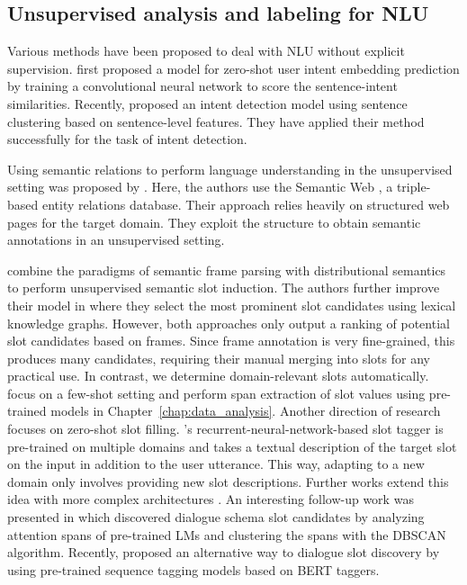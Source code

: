 \subsection{Unsupervised analysis and labeling for NLU}
Various methods have been proposed to deal with NLU without explicit supervision.
\citet{chen2016zero} first proposed a model for zero-shot user intent embedding prediction by training a convolutional neural network to score the sentence-intent similarities.
Recently, \citet{shi2018auto} proposed an intent detection model using sentence clustering based on sentence-level features.
They have applied their method successfully for the task of intent detection.

Using semantic relations to perform language understanding in the unsupervised setting was proposed by \citet{heck2012exploiting}.
Here, the authors use the Semantic Web \cite{berners2001semantic}, a triple-based entity relations database.
Their approach relies heavily on structured web pages for the target domain.
They exploit the structure to obtain semantic annotations in an unsupervised setting.

\label{sec:relwork-chen}
\citet{chen2014leveraging} combine the paradigms of semantic frame parsing with distributional semantics to perform unsupervised semantic slot induction.
The authors further improve their model in \citet{chen2015jointly} where they select the most prominent slot candidates using lexical knowledge graphs.
However, both approaches only output a ranking of potential slot candidates based on frames.
Since frame annotation is very fine-grained, this produces many candidates, requiring their manual merging  %
into slots for any practical use.
In contrast, we determine domain-relevant slots automatically.
\citet{coope_span-convert_2020} focus on a few-shot setting and perform span extraction of slot values using pre-trained models in Chapter~\ref{chap:data_analysis}.
Another direction of research focuses on zero-shot slot filling.  \citet{bapna2017towards}'s recurrent-neural-network-based slot tagger is pre-trained on multiple domains and takes a textual description of the target slot on the input in addition to the user utterance. This way, adapting to a new domain only involves providing new slot descriptions.
Further works extend this idea with more complex architectures \cite{shah2019robust,liu2020coach}.
An interesting follow-up work was presented in \citet{yu-etal-2022-unsupervised} which discovered dialogue schema slot candidates by analyzing attention spans of pre-trained LMs and clustering the spans with the DBSCAN algorithm.
Recently, \citet{qiu2022structure} proposed an alternative way to dialogue slot discovery by using pre-trained sequence tagging models based on BERT taggers.

